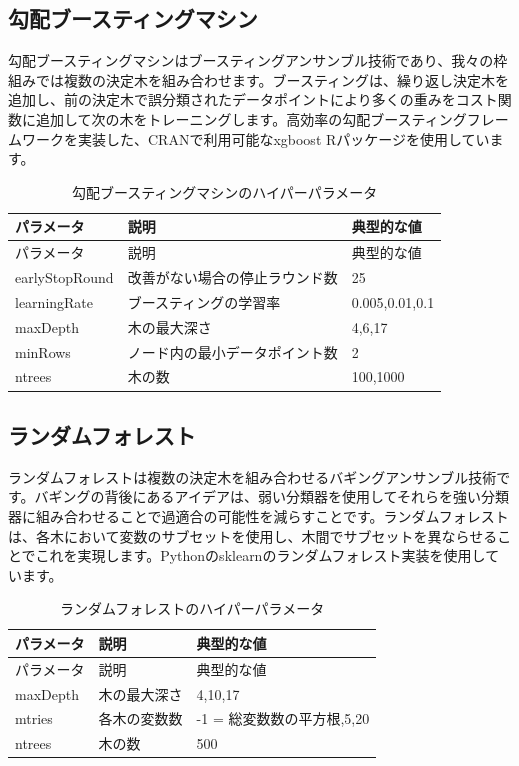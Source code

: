 \documentclass[
  11pt]{book}
\theoremstyle{definition}
\theoremstyle{definition}
\theoremstyle{definition}
\theoremstyle{definition}
\theoremstyle{remark}
\begin{document}
\subsection{勾配ブースティングマシン}\label{ux52feux914dux30d6ux30fcux30b9ux30c6ux30a3ux30f3ux30b0ux30deux30b7ux30f3}

勾配ブースティングマシンはブースティングアンサンブル技術であり、我々の枠組みでは複数の決定木を組み合わせます。ブースティングは、繰り返し決定木を追加し、前の決定木で誤分類されたデータポイントにより多くの重みをコスト関数に追加して次の木をトレーニングします。高効率の勾配ブースティングフレームワークを実装した、CRANで利用可能なxgboost Rパッケージを使用しています。  

\begin{longtable}[]{@{}lll@{}}
\caption{\label{tab:gbmParameters} 勾配ブースティングマシンのハイパーパラメータ}\tabularnewline
\toprule\noalign{}
パラメータ & 説明 & 典型的な値 \\
\midrule\noalign{}
\endfirsthead
\toprule\noalign{}
パラメータ & 説明 & 典型的な値 \\
\midrule\noalign{}
\endhead
\bottomrule\noalign{}
\endlastfoot
earlyStopRound & 改善がない場合の停止ラウンド数 & 25 \\
learningRate & ブースティングの学習率 & 0.005,0.01,0.1 \\
maxDepth & 木の最大深さ & 4,6,17 \\
minRows & ノード内の最小データポイント数 & 2 \\
ntrees & 木の数 & 100,1000 \\
\end{longtable}

\subsection{ランダムフォレスト}\label{ux30e9ux30f3ux30c0ux30e0ux30d5ux30a9ux30ecux30b9ux30c8}

ランダムフォレストは複数の決定木を組み合わせるバギングアンサンブル技術です。バギングの背後にあるアイデアは、弱い分類器を使用してそれらを強い分類器に組み合わせることで過適合の可能性を減らすことです。ランダムフォレストは、各木において変数のサブセットを使用し、木間でサブセットを異ならせることでこれを実現します。Pythonのsklearnのランダムフォレスト実装を使用しています。   

\begin{longtable}[]{@{}lll@{}}
\caption{\label{tab:randomForestParameters} ランダムフォレストのハイパーパラメータ}\tabularnewline
\toprule\noalign{}
パラメータ & 説明 & 典型的な値 \\
\midrule\noalign{}
\endfirsthead
\toprule\noalign{}
パラメータ & 説明 & 典型的な値 \\
\midrule\noalign{}
\endhead
\bottomrule\noalign{}
\endlastfoot
maxDepth & 木の最大深さ & 4,10,17 \\
mtries & 各木の変数数 & -1 = 総変数数の平方根,5,20 \\
ntrees & 木の数 & 500 \\
\end{longtable}
\end{document}
